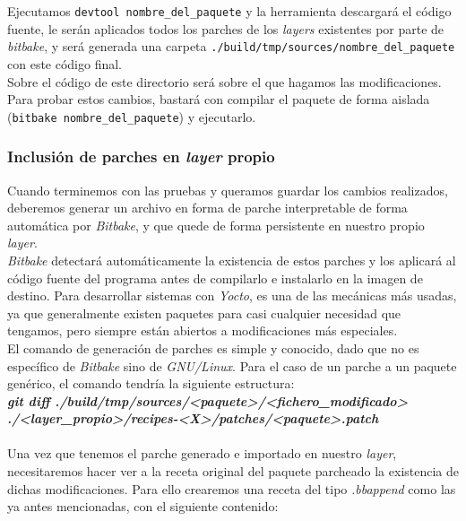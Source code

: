 Ejecutamos \texttt{devtool nombre\_del\_paquete} y la herramienta descargará el código fuente, le serán aplicados todos los parches de los \textit{layers} existentes por parte de \textit{bitbake}, y será generada una carpeta \texttt{./build/tmp/sources/nombre\_del\_paquete} con este código final.\\

Sobre el código de este directorio será sobre el que hagamos las modificaciones. Para probar estos cambios, bastará con compilar el paquete de forma aislada (\texttt{bitbake nombre\_del\_paquete}) y ejecutarlo.\\

\subsubsection{Inclusión de parches en \textit{layer} propio}

Cuando terminemos con las pruebas y queramos guardar los cambios realizados, deberemos generar un archivo en forma de parche interpretable de forma automática por \textit{Bitbake}, y que quede de forma persistente en nuestro propio \textit{layer}.\\

\textit{Bitbake} detectará automáticamente la existencia de estos parches y los aplicará al código fuente del programa antes de compilarlo e instalarlo en la imagen de destino. Para desarrollar sistemas con \textit{Yocto}, es una de las mecánicas más usadas, ya que generalmente existen paquetes para casi cualquier necesidad que tengamos, pero siempre están abiertos a modificaciones más especiales.\\

El comando de generación de parches es simple y conocido, dado que no es específico de \textit{Bitbake} sino de \textit{GNU/Linux}. Para el caso de un parche a un paquete genérico, el comando tendría la siguiente estructura:\\

\textit{\textbf{git diff ./build/tmp/sources/<paquete>/<fichero\_modificado> \\./<layer\_propio>/recipes-<X>/patches/<paquete>.patch}}\\

\noindent\makebox[\linewidth]{\rule{\textwidth}{0.4pt}}\\

Una vez que tenemos el parche generado e importado en nuestro \textit{layer}, necesitaremos hacer ver a la receta original del paquete parcheado la existencia de dichas modificaciones. Para ello crearemos una receta del tipo \textit{.bbappend} como las ya antes mencionadas, con el siguiente contenido:

